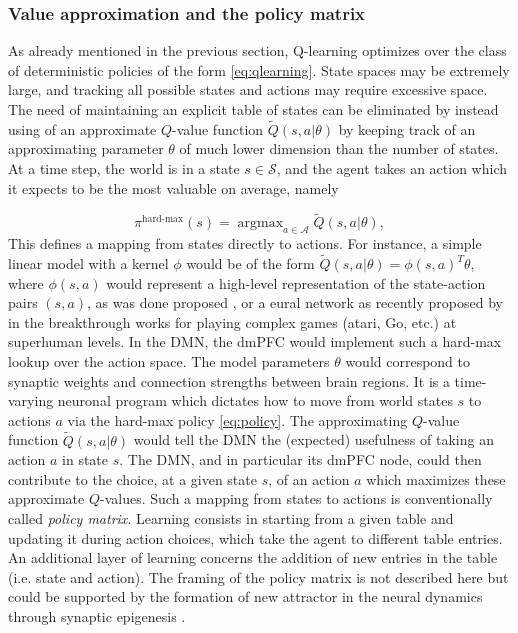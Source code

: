 \documentclass[10pt,letterpaper]{article}
\DeclareMathOperator{\argmax}{argmax}
\newcommand{\suggestadd}[1]{{\color{blue} #1}}
\begin{document}
\subsubsection{Value approximation and the policy matrix}
As already mentioned in the previous section, Q-learning optimizes over the class of
deterministic policies of the form \eqref{eq:qlearning}. State spaces may be extremely large,
and tracking all possible states and actions may require excessive space.
The need of maintaining an explicit table of
states can be eliminated by instead using of an approximate $Q$-value function $\tilde{Q}(s,a|\theta)$
by keeping track of an approximating parameter $\theta$ of much lower dimension than the number of states.
At a time step, the world is in a state $s \in \mathcal S$, and the agent takes an
action which it expects to be the most valuable on average, namely

\begin{equation}
  \pi^{\text{hard-max}}(s) = \argmax_{a \in \mathcal A}\tilde{Q}(s, a|\theta),
  \label{eq:policy}
\end{equation}
This defines a mapping from states directly to actions.
For instance, a simple linear model with a kernel $\phi$ would be of the
form $\tilde{Q}(s, a|\theta) = \phi(s,a)^T\theta$, where
$\phi(s,a)$ would represent a high-level representation of the state-action pairs
$(s,a)$, as was done proposed \citep{songNIPS2016}, or a eural network as recently proposed by in the
breakthrough works
\citep{mnih2015,silver2016mastering} for playing complex games (atari, Go, etc.) at superhuman levels.
In the DMN, the dmPFC would implement such a hard-max lookup
over the action space.
The model
  parameters $\theta$ would correspond to synaptic weights and connection strengths between
  brain regions. It is a time-varying neuronal program which dictates how to move from world states $s$ to actions $a$ via the hard-max policy \eqref{eq:policy}.
  The approximating $Q$-value function $\tilde{Q}(s, a|\theta)$ would tell the DMN the (expected) usefulness of taking an action $a$ in state $s$.
  The DMN, and in particular its dmPFC node, could then contribute to the choice, at a given state $s$, of an action $a$ which maximizes these approximate
  $Q$-values. Such a mapping from states to actions is conventionally called \textit{policy matrix}\citep{mnih2015,silver2016mastering}.
  Learning consists in starting from a given table and
  updating it during action choices,
  which take the agent to different table entries. \suggestadd{An additional layer of learning concerns the addition of new entries in the table (i.e. state and action). The framing of the policy matrix is not described here but could be supported by the formation of new attractor in the neural dynamics through synaptic epigenesis \citep{gisiger_acquisition_2005}.}
\end{document}
